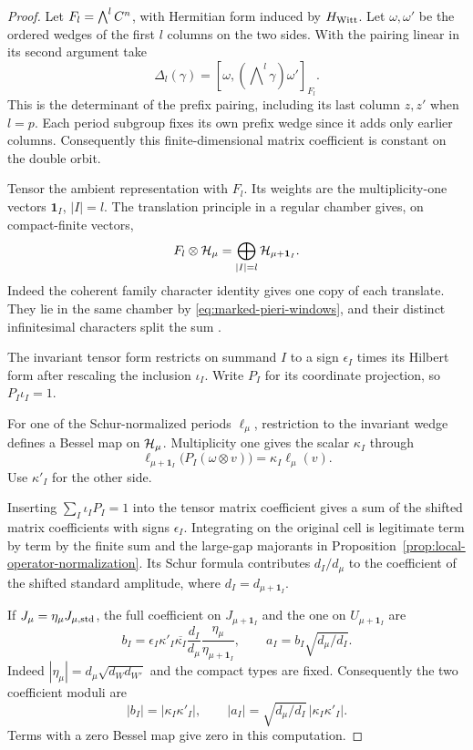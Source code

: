 \begin{proof}
Let \(F_l=\bigwedge^lC^n\), with Hermitian form induced by
\(H_{\rm Witt}\). Let \(\omega,\omega'\) be the ordered wedges of
the first \(l\) columns on the two sides. With the pairing linear
in its second argument take
\[
 \Delta_l(\gamma)=
   [\omega,(\bigwedge\nolimits^l\gamma)\omega']_{F_l}.
\]
This is the determinant of the prefix pairing, including its last
column \(z,z'\) when \(l=p\). Each period subgroup fixes its own
prefix wedge since it adds only earlier columns. Consequently this
finite-dimensional matrix coefficient is constant on the double orbit.

Tensor the ambient representation with \(F_l\). Its weights are the
multiplicity-one vectors \(\mathbf1_I\), \(|I|=l\). The translation
principle in a regular chamber gives, on compact-finite vectors,
\[
 F_l\otimes{\cal H}_\mu
       =\bigoplus_{|I|=l}{\cal H}_{\mu+\mathbf1_I}.
\]
Indeed the coherent family character identity gives one copy of each
translate. They lie in the same chamber by
\eqref{eq:marked-pieri-windows}, and their distinct infinitesimal
characters split the sum
\cite[\S4, (4.1) and the discussion preceding Proposition~4.3]{mpv-translation}.

The invariant tensor form restricts on summand \(I\) to a sign
\(\epsilon_I\) times its Hilbert form after rescaling the inclusion
\(\iota_I\). Write \(P_I\) for its coordinate projection, so
\(P_I\iota_I=1\).

For one of the Schur-normalized periods \(\ell_\mu\), restriction to
the invariant wedge defines a Bessel map on \({\cal H}_\mu\).
Multiplicity one gives the scalar \(\kappa_I\) through
\[
 \ell_{\mu+\mathbf1_I}\big(P_I(\omega\otimes v)\big)
               =\kappa_I\ell_\mu(v).
\]
Use \(\kappa'_I\) for the other side.

Inserting
\(\sum_I\iota_IP_I=1\) into the tensor matrix coefficient gives
a sum of the shifted matrix coefficients with signs \(\epsilon_I\).
Integrating on the original cell is legitimate term by term by the
finite sum and the large-gap majorants in
Proposition~\ref{prop:local-operator-normalization}. Its
Schur formula contributes \(d_I/d_\mu\) to the coefficient of
the shifted standard amplitude, where \(d_I=d_{\mu+\mathbf1_I}\).

If \(J_\mu=\eta_\mu J_{\mu,{\rm std}}\), the full coefficient on
\(J_{\mu+\mathbf1_I}\) and the one on \(U_{\mu+\mathbf1_I}\) are
\[
 b_I=\epsilon_I\kappa'_I\overline{\kappa_I}
       \frac{d_I}{d_\mu}\frac{\eta_\mu}{\eta_{\mu+\mathbf1_I}},
 \qquad
 a_I=b_I\sqrt{d_\mu/d_I}.
\]
Indeed \(|\eta_\mu|=d_\mu\sqrt{d_Wd_{W'}}\) and the compact types
are fixed. Consequently the two coefficient moduli are
\[
  |b_I|=|\kappa_I\kappa'_I|,\qquad
  |a_I|=\sqrt{d_\mu/d_I}\,|\kappa_I\kappa'_I| .
\]
Terms with a zero Bessel map give zero in this computation.


\end{proof}
